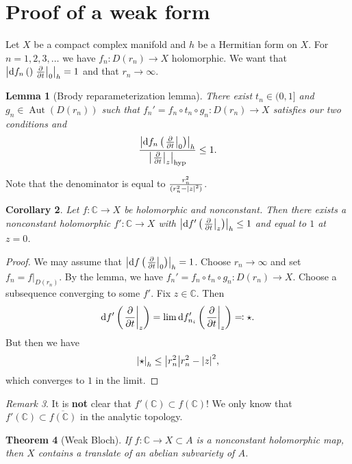 \documentclass[leqno, openany]{memoir}
\newtheorem{thm}{Theorem}[section]
\newtheorem{cor}[thm]{Corollary}
\newtheorem{lem}[thm]{Lemma}
\theoremstyle{definition}
\theoremstyle{remark}
\newtheorem{rmk}[thm]{Remark}
\theoremstyle{plain}
\theoremstyle{definition}
\theoremstyle{remark}
\newcommand{\C}{\mathbb{C}}
\newcommand{\mr}[1]{\mathrm{#1}}
\newcommand{\ol}[1]{\overline{#1}}
\DeclareMathOperator{\Aut}{Aut}
\begin{document}
\section{Proof of a weak form}

Let $X$ be a compact complex manifold and $h$ be a Hermitian form on $X$. For $n = 1,2, 3, \ldots$ we have $f_n \colon D(r_n) \to X$ holomorphic. We want that $\abs{\dd{f_n}\qty\eval{\pdv{t}}_0}_h = 1$ and that $r_n \to \infty$.

\begin{lem}[Brody reparameterization lemma]
    There exist $t_n \in (0,1]$ and $g_n \in \Aut(D(r_n))$ such that $f_n' = f_n \circ t_n \circ g_n \colon D(r_n) \to X$ satisfies our two conditions and
    \[ \frac{\abs{\dd{f_n} \qty(\eval{\pdv{t}}_0)}_h}{\abs{\eval{\pdv{t}}_z}_{\mr{hyp}}} \leq 1. \]
\end{lem}
Note that the denominator is equal to $\frac{r_n^2}{(r_n^2 - \abs{z}^2)}$.

\begin{cor}
    Let $f \colon \C \to X$ be holomorphic and nonconstant. Then there exists a nonconstant holomorphic $f' \colon \C \to X$ with $\abs{\dd{f'}\qty(\eval{ \pdv{t} }_z)}_h \leq 1$ and equal to $1$ at $z=0$.
\end{cor}

\begin{proof}
    We may assume that $\abs{\dd{f}\qty(\eval{\pdv{t}}_0)}_h = 1$. Choose $r_n \to \infty$ and set $f_n = f |_{D(r_n)}$. By the lemma, we have $f_n' = f_n \circ t_n \circ g_n \colon D(r_n) \to X$. Choose a subsequence converging to some $f'$. Fix $z \in \C$. Then
    \[ \dd{f'} \qty(\eval{\pdv{t}}_z) = \lim \dd{f_{n_i}'} \qty(\eval{\pdv{t}}_z) \eqqcolon \star. \]
    But then we have
    \[ \abs{\star}_h \leq \abs{r_n^2}{r_n^2 - \abs{z}^2}, \]
    which converges to $1$ in the limit.
\end{proof}

\begin{rmk}
    It is \textbf{not} clear that $f'(\C) \subset f(\C)$! We only know that $f'(\C) \subset \ol{f(\C)}$ in the analytic topology.
\end{rmk}

\begin{thm}[Weak Bloch]
    If $f \colon \C \to X \subset A$ is a nonconstant holomorphic map, then $X$ contains a translate of an abelian subvariety of $A$.
\end{thm}
\end{document}
